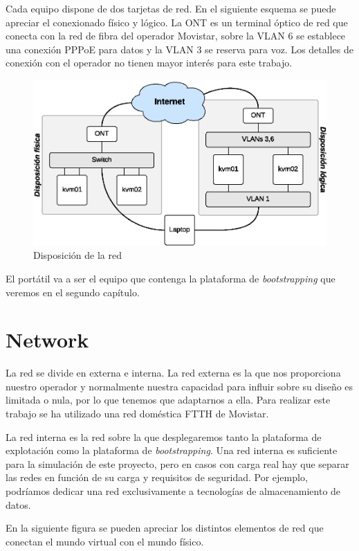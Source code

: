 \documentclass[a4paper,12pt,spanish,final]{epsc_tfc_pfc}
\begin{document}
Cada equipo dispone de dos tarjetas de red. En el siguiente esquema se puede apreciar el conexionado físico y lógico. La ONT es un terminal óptico de red que conecta con la red de fibra del operador Movistar, sobre la VLAN 6 se establece una conexión PPPoE para datos y la VLAN 3 se reserva para voz. Los detalles de conexión con el operador no tienen mayor interés para este trabajo.

\begin{figure}[h]
  \centering
    \includegraphics[scale=1]{layout}
      \caption{Disposición de la red}
\end{figure}

El portátil va a ser el equipo que contenga la plataforma de \emph{bootstrapping} que veremos en el segundo capítulo.

\section{Network}

La red se divide en externa e interna. La red externa es la que nos proporciona nuestro operador y normalmente nuestra capacidad para influir sobre su diseño es limitada o nula, por lo que tenemos que adaptarnos a ella. Para realizar este trabajo se ha utilizado una red doméstica FTTH de Movistar.

La red interna es la red sobre la que desplegaremos tanto la plataforma de explotación como la plataforma de \emph{bootstrapping}. Una red interna es suficiente para la simulación de este proyecto, pero en casos con carga real hay que separar las redes en función de su carga y requisitos de seguridad. Por ejemplo, podríamos dedicar una red exclusivamente a tecnologías de almacenamiento de datos.

En la siguiente figura se pueden apreciar los distintos elementos de red que conectan el mundo virtual con el mundo físico.
\end{document}
